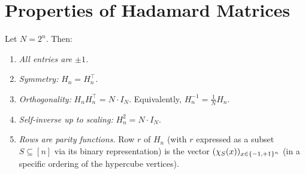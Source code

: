 \section{Properties of Hadamard Matrices}\label{sec:hadamard-props}

\begin{theorem}[Properties of $H_n$]\label{thm:hadamard-props}
Let $N = 2^n$. Then:
\begin{enumerate}[label=(\roman*)]
  \item \emph{All entries are $\pm 1$.}
  \item \emph{Symmetry:} $H_n = H_n^\top$.
  \item \emph{Orthogonality:} $H_n H_n^\top = N \cdot I_N$.
    Equivalently, $H_n^{-1} = \frac{1}{N} H_n$.
  \item \emph{Self-inverse up to scaling:} $H_n^2 = N \cdot I_N$.
  \item \emph{Rows are parity functions.} Row $r$ of $H_n$ (with $r$
    expressed as a subset $S \subseteq [n]$ via its binary
    representation) is the vector
    $(\chi_S(x))_{x \in \{-1,+1\}^n}$ (in a specific ordering of
    the hypercube vertices).
\end{enumerate}
\end{theorem}

